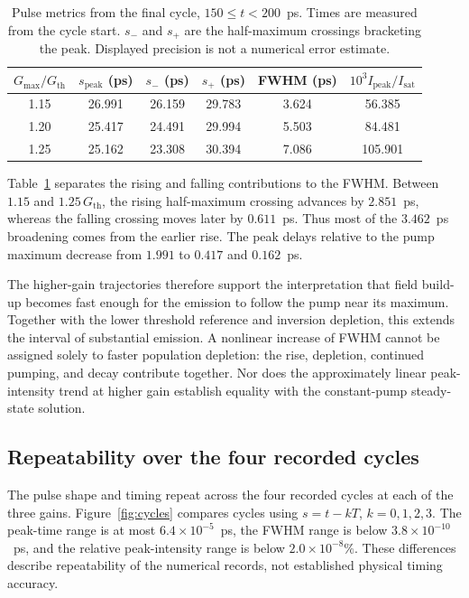 \documentclass[9pt]{osa-supplemental-document}
\begin{document}
\begin{table}[htbp]
\centering
\caption{Pulse metrics from the final cycle, $150\leq t<200$~ps. Times are measured from the cycle start. $s_-$ and $s_+$ are the half-maximum crossings bracketing the peak. Displayed precision is not a numerical error estimate.}
\label{tab:metrics}
\begin{tabular}{@{}cccccc@{}}
\toprule
$G_{\max}/G_{\mathrm{th}}$ & $s_{\mathrm{peak}}$ (ps) & $s_-$ (ps) & $s_+$ (ps) & FWHM (ps) & $10^3I_{\mathrm{peak}}/I_{\mathrm{sat}}$\\
\midrule
1.15 & 26.991 & 26.159 & 29.783 & 3.624 & 56.385\\
1.20 & 25.417 & 24.491 & 29.994 & 5.503 & 84.481\\
1.25 & 25.162 & 23.308 & 30.394 & 7.086 & 105.901\\
\bottomrule
\end{tabular}
\end{table}

Table~\ref{tab:metrics} separates the rising and falling contributions to the FWHM. Between $1.15$ and $1.25\,G_{\mathrm{th}}$, the rising half-maximum crossing advances by $2.851$~ps, whereas the falling crossing moves later by $0.611$~ps. Thus most of the $3.462$~ps broadening comes from the earlier rise. The peak delays relative to the pump maximum decrease from $1.991$ to $0.417$ and $0.162$~ps.

The higher-gain trajectories therefore support the interpretation that field build-up becomes fast enough for the emission to follow the pump near its maximum. Together with the lower threshold reference and inversion depletion, this extends the interval of substantial emission. A nonlinear increase of FWHM cannot be assigned solely to faster population depletion: the rise, depletion, continued pumping, and decay contribute together. Nor does the approximately linear peak-intensity trend at higher gain establish equality with the constant-pump steady-state solution.

\subsection{Repeatability over the four recorded cycles}
The pulse shape and timing repeat across the four recorded cycles at each of the three gains. Figure~\ref{fig:cycles} compares cycles using $s=t-kT$, $k=0,1,2,3$. The peak-time range is at most $6.4\times10^{-5}$~ps, the FWHM range is below $3.8\times10^{-10}$~ps, and the relative peak-intensity range is below $2.0\times10^{-8}\%$. These differences describe repeatability of the numerical records, not established physical timing accuracy.
\end{document}

